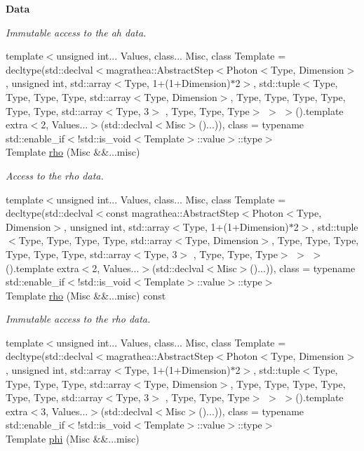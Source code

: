 \begin{Indent}{\bf Data}
\begin{DoxyCompactItemize}
\begin{DoxyCompactList}\small\item\em Immutable access to the ah data. \end{DoxyCompactList}\item 
{\footnotesize template$<$unsigned int... Values, class... Misc, class Template  = decltype(std\-::declval$<$magrathea\-::\-Abstract\-Step$<$\-Photon$<$\-Type, Dimension$>$, unsigned int, std\-::array$<$\-Type, 1+(1+\-Dimension)$\ast$2$>$, std\-::tuple$<$\-Type, Type, Type, Type, std\-::array$<$\-Type, Dimension$>$, Type, Type, Type, Type, Type, Type, std\-::array$<$\-Type, 3$>$ , Type, Type, Type$>$ $>$ $>$().\-template extra$<$2, Values...$>$(std\-::declval$<$\-Misc$>$()...)), class  = typename std\-::enable\-\_\-if$<$!std\-::is\-\_\-void$<$\-Template$>$\-::value$>$\-::type$>$ }\\Template \hyperlink{exceptionPhoton_a3cda541e4ece7da351e5cd4098dde9b8}{rho} (Misc \&\&...misc)
\begin{DoxyCompactList}\small\item\em Access to the rho data. \end{DoxyCompactList}\item 
{\footnotesize template$<$unsigned int... Values, class... Misc, class Template  = decltype(std\-::declval$<$const magrathea\-::\-Abstract\-Step$<$\-Photon$<$\-Type, Dimension$>$, unsigned int, std\-::array$<$\-Type, 1+(1+\-Dimension)$\ast$2$>$, std\-::tuple$<$\-Type, Type, Type, Type, std\-::array$<$\-Type, Dimension$>$, Type, Type, Type, Type, Type, Type, std\-::array$<$\-Type, 3$>$ , Type, Type, Type$>$ $>$ $>$().\-template extra$<$2, Values...$>$(std\-::declval$<$\-Misc$>$()...)), class  = typename std\-::enable\-\_\-if$<$!std\-::is\-\_\-void$<$\-Template$>$\-::value$>$\-::type$>$ }\\Template \hyperlink{exceptionPhoton_a1de0093fc308e22d0777c825c3ffe986}{rho} (Misc \&\&...misc) const 
\begin{DoxyCompactList}\small\item\em Immutable access to the rho data. \end{DoxyCompactList}\item 
{\footnotesize template$<$unsigned int... Values, class... Misc, class Template  = decltype(std\-::declval$<$magrathea\-::\-Abstract\-Step$<$\-Photon$<$\-Type, Dimension$>$, unsigned int, std\-::array$<$\-Type, 1+(1+\-Dimension)$\ast$2$>$, std\-::tuple$<$\-Type, Type, Type, Type, std\-::array$<$\-Type, Dimension$>$, Type, Type, Type, Type, Type, Type, std\-::array$<$\-Type, 3$>$ , Type, Type, Type$>$ $>$ $>$().\-template extra$<$3, Values...$>$(std\-::declval$<$\-Misc$>$()...)), class  = typename std\-::enable\-\_\-if$<$!std\-::is\-\_\-void$<$\-Template$>$\-::value$>$\-::type$>$ }\\Template \hyperlink{exceptionPhoton_adcad162fb2b9193abb549e0d057662c0}{phi} (Misc \&\&...misc)

\end{DoxyCompactItemize}
\end{Indent}
